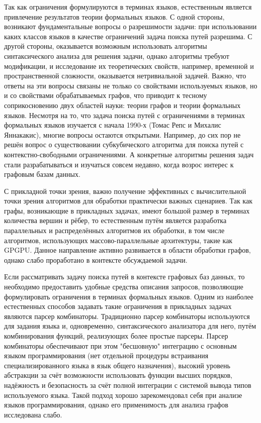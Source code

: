 \documentclass[12pt]{article}  %
\theoremstyle{remark}
\begin{document}
Так как ограничения формулируются в терминах языков, естественным является привлечение результатов теории формальных языков.
С одной стороны, возникают фундаментальные вопросы о разрешимости задачи: при использовании каких классов языков в качестве ограничений задача поиска путей разрешима.
С другой стороны, оказывается возможным использовать алгоритмы синтаксического анализа для решения задачи, однако алгоритмы требуют модификации, и исследование их теоретических свойств, например, временной и пространственной сложности, оказывается нетривиальной задачей.
Важно, что ответы на эти вопросы связаны не только со свойствами используемых языков, но и со свойствами обрабатываемых графов, что приводит к тесному соприкосновению двух областей науки: теории графов и теории формальных языков.
Несмотря на то, что задача поиска путей с ограничениями в терминах формальных языков изучается с начала 1990-х (Томас Репс и Михалис Яннакакис), многие вопросы остаются открытыми.
Например, до сих пор не решён вопрос о существовании субкубического алгоритма для поиска путей с контекстно-свободными ограничениями.
А конкретные алгоритмы решения задач стали разрабатываться и изучаться совсем недавно, когда возрос интерес к графовым базам данных.

С прикладной точки зрения, важно получение эффективных с вычислительной точки зрения алгоритмов для обработки практически важных сценариев.
Так как графы, возникающие в прикладных задачах, имеют большой размер в терминах количества вершин и рёбер, то естественным путём является разработка параллельных и распределённых алгоритмов их обработки, в том числе алгоритмов, использующих массово-параллельные архитектуры, такие как GPGPU.
Данное направление активно развивается в области обработки графов, однако слабо проработано в контексте обсуждаемой задачи.

Если рассматривать задачу поиска путей в контексте графовых баз данных, то необходимо предоставить удобные средства описания запросов, позволяющие формулировать ограничения в терминах формальных языков.
Одним из наиболее естественных способов задавать такие ограничения в прикладных задачах являются парсер комбинаторы.
Традиционно парсер комбинаторы используются для задания языка и, одновременно, синтаксического анализатора для него, путём комбинирования функций, реализующих более простые парсеры.
Парсер комбинаторы обеспечивают при этом "бесшовную" интеграцию с основным языком программирования (нет отдельной процедуры встраивания специализированного языка в язык общего назначения), высокий уровень абстракции за счёт возможности использовать функции высших порядков, надёжность и безопасность за счёт полной интеграции с системой вывода типов используемого языка.
Такой подход хорошо зарекомендовал себя при анализе языков программирования, однако его применимость для анализа графов исследована слабо.
\end{document}
